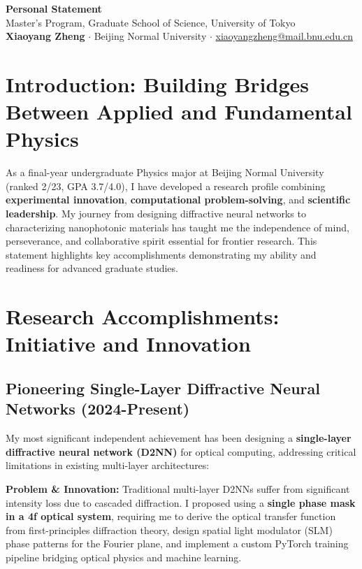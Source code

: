 \documentclass[11pt,a4paper]{article}
\begin{document}
\begin{center}
    {\large \textbf{Personal Statement}}\\[0.2em]
    {\normalsize Master's Program, Graduate School of Science, University of Tokyo}\\[0.4em]
    \textbf{Xiaoyang Zheng} $\cdot$ Beijing Normal University $\cdot$ \href{mailto:xiaoyangzheng@mail.bnu.edu.cn}{xiaoyangzheng@mail.bnu.edu.cn}
\end{center}

\vspace{-0.4em}

\section{Introduction: Building Bridges Between Applied and Fundamental Physics}

As a final-year undergraduate Physics major at Beijing Normal University (ranked 2/23, GPA 3.7/4.0), I have developed a research profile combining \textbf{experimental innovation}, \textbf{computational problem-solving}, and \textbf{scientific leadership}. My journey from designing diffractive neural networks to characterizing nanophotonic materials has taught me the independence of mind, perseverance, and collaborative spirit essential for frontier research. This statement highlights key accomplishments demonstrating my ability and readiness for advanced graduate studies.

\section{Research Accomplishments: Initiative and Innovation}

\subsection{Pioneering Single-Layer Diffractive Neural Networks (2024-Present)}

My most significant independent achievement has been designing a \textbf{single-layer diffractive neural network (D2NN)} for optical computing, addressing critical limitations in existing multi-layer architectures:

\textbf{Problem \& Innovation:} Traditional multi-layer D2NNs suffer from significant intensity loss due to cascaded diffraction. I proposed using a \textbf{single phase mask in a 4f optical system}, requiring me to derive the optical transfer function from first-principles diffraction theory, design spatial light modulator (SLM) phase patterns for the Fourier plane, and implement a custom PyTorch training pipeline bridging optical physics and machine learning.
\end{document}
